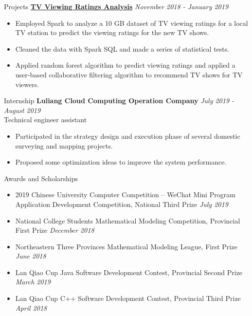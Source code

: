 \documentclass{resume} %
\begin{document}
\begin{rSection}{Projects}
{\bf \href{https://github.com/Mark-Fenng/TV-Ratings}{TV Viewing Ratings Analysis}} \hfill {\em November 2018 - January 2019}
\begin{itemize}[itemsep=-0.3em]
    \item Employed Spark to analyze a 10 GB dataset of TV viewing ratings for a local TV station to predict the viewing ratings for the new TV shows.
    \item Cleaned the data with Spark SQL and made a series of statistical tests.
    \item Applied random forest algorithm to predict viewing ratings and applied a user-based collaborative filtering algorithm to recommend TV shows for TV viewers. 
\end{itemize}
\end{rSection}
\begin{rSection}{Internship}
    {\bf Luliang Cloud Computing Operation Company} \hfill {\em July 2019 - August 2019}\\
    {Technical engineer assistant}
        \begin{itemize}[itemsep=-0.3em]
            \item Participated in the strategy design and execution phase of several domestic surveying and mapping projects. 
            \item Proposed some optimization ideas to improve the system performance.
        \end{itemize}
\end{rSection}
\begin{rSection}{Awards and Scholarships} 
    \begin{itemize}[leftmargin=0pt,itemsep=-0.3em]
        \item { 2019 Chinese University Computer Competition – WeChat Mini Program Application Development Competition, National Third Prize} \hfill{\em July 2019}
        \item { National College Students Mathematical Modeling Competition, Provincial First Prize} \hfill{\em December 2018}
        \item { Northeastern Three Provinces Mathematical Modeling League, First Prize}  \hfill {\em June 2018}
        \item { Lan Qiao Cup Java Software Development Contest, Provincial Second Prize}  \hfill {\em March 2019}
        \item { Lan Qiao Cup C++ Software Development Contest, Provincial Third Prize}  \hfill {\em April 2018}
    \end{itemize}
\end{rSection}
\end{document}
